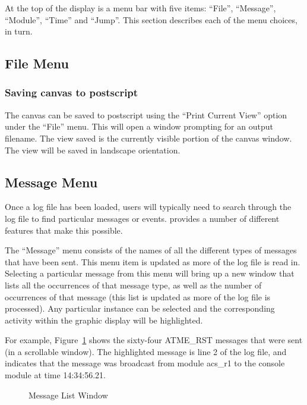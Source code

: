 At the top of the \comview{} display is a menu bar with five items: ``File'',
``Message'', ``Module'', ``Time'' and ``Jump''.  This section describes each
of the menu choices, in turn.

\subsection{File Menu}

\subsubsection{Saving canvas to postscript}

The canvas can be saved to postscript using the ``Print Current View''
option under the ``File'' menu. This will open a window prompting for
an output filename. The view saved is the currently visible portion of
the canvas window. The view will be saved in landscape orientation.

\subsection{Message Menu}

Once a log file has been loaded, users will typically need to search through
the log file to find particular messages or events. \comview{} provides a number
of different features that make this possible.

The ``Message'' menu consists of the names of all the different types of
messages that have 
been sent.  This menu item is updated as more of the log file is read in.
Selecting a particular message from this menu will bring up
a new window that lists all the occurrences of that 
message type, as well as the number of occurrences of that message (this list
is updated as more of the log file is processed). Any particular instance can
be selected and the corresponding 
activity within the graphic display will be highlighted.  

For example, Figure~\ref{fig:msglist} shows the sixty-four ATME\_RST messages
that were 
sent (in a scrollable window). The highlighted message is line 2 of the log
file, and indicates that the message was broadcast from module acs\_r1 to the
console module at time 14:34:56.21.

\begin{figure}[htp]
\centerline{\epsfysize=2in }
\caption{Message List Window}
\label{fig:msglist}
\end{figure}

